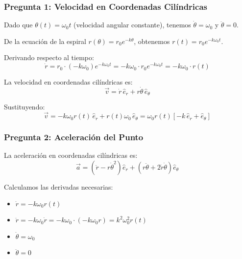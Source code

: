 
\begin{sol}

\subsubsection*{Pregunta 1: Velocidad en Coordenadas Cilíndricas}

Dado que $\theta(t) = \omega_0 t$ (velocidad angular constante), tenemos $\dot{\theta} = \omega_0$ y $\ddot{\theta} = 0$.

De la ecuación de la espiral $r(\theta) = r_0 e^{-k\theta}$, obtenemos $r(t) = r_0 e^{-k\omega_0 t}$.

Derivando respecto al tiempo:
$$\dot{r} = r_0 \cdot (-k\omega_0) e^{-k\omega_0 t} = -k\omega_0 \cdot r_0 e^{-k\omega_0 t} = -k\omega_0 \cdot r(t)$$

La velocidad en coordenadas cilíndricas es:
$$\vec{v} = \dot{r} \, \hat{e}_r + r\dot{\theta} \, \hat{e}_\theta$$

Sustituyendo:
\begin{equation}
\boxed{\vec{v} = -k\omega_0 r(t) \, \hat{e}_r + r(t) \omega_0 \, \hat{e}_\theta = \omega_0 r(t) \left[ -k \, \hat{e}_r + \hat{e}_\theta \right]}
\end{equation}

\subsubsection*{Pregunta 2: Aceleración del Punto}

La aceleración en coordenadas cilíndricas es:
$$\vec{a} = (\ddot{r} - r\dot{\theta}^2) \hat{e}_r + (r\ddot{\theta} + 2\dot{r}\dot{\theta}) \hat{e}_\theta$$

Calculamos las derivadas necesarias:
\begin{itemize}
    \item $\dot{r} = -k\omega_0 r(t)$
    \item $\ddot{r} = -k\omega_0 \dot{r} = -k\omega_0 \cdot (-k\omega_0 r) = k^2 \omega_0^2 r(t)$
    \item $\dot{\theta} = \omega_0$
    \item $\ddot{\theta} = 0$
\end{itemize}


\end{sol}
